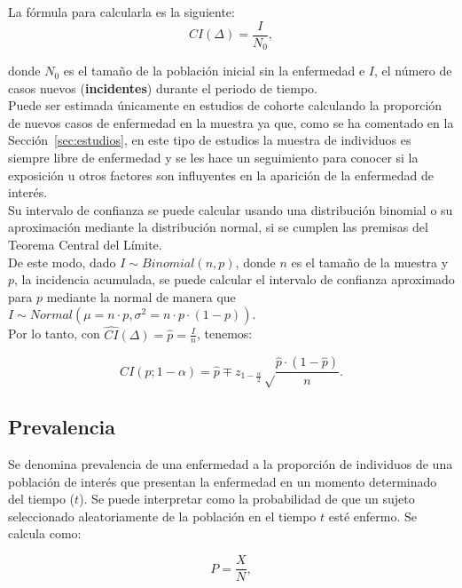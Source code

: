 La fórmula para calcularla es la siguiente:
\begin{equation*}
CI(\Delta)=\frac{I}{N_0},
\end{equation*}

donde $N_0$ es el tamaño de la población inicial sin la enfermedad e $I$, el número de casos nuevos (\textbf{incidentes}) durante el periodo de tiempo. \\

Puede ser estimada únicamente en estudios de cohorte calculando la proporción de nuevos casos de enfermedad en la muestra ya que, como se ha comentado en la Sección~\ref{sec:estudios}, en este tipo de estudios la muestra de individuos es siempre libre de enfermedad y se les hace un seguimiento para conocer si la exposición u otros factores son influyentes en la aparición de la enfermedad de interés. \\

Su intervalo de confianza se puede calcular usando una distribución binomial o su aproximación mediante la distribución normal, si se cumplen las premisas del Teorema Central del Límite. \\

De este modo, dado $I \sim Binomial(n,p)$, donde $n$ es el tamaño de la muestra y $p$, la incidencia acumulada, se puede calcular el intervalo de confianza aproximado para $p$ mediante la normal de manera que $I \sim Normal(\mu=n \cdot p, \sigma^2=n \cdot p \cdot (1-p))$. \\

Por lo tanto, con $\widehat{CI}(\Delta)=\hat{p}=\frac{I}{n}$, tenemos:

\begin{equation*}
CI(p;1-\alpha)=\hat{p} \mp z_{1-\frac{\alpha}{2}} \sqrt \frac{\hat{p} \cdot (1-\hat{p})}{n}.
\end{equation*}


\subsection{Prevalencia}
Se denomina prevalencia de una enfermedad a la proporción de individuos de una población de interés que presentan la enfermedad en un momento determinado del tiempo ($t$). Se puede interpretar como la probabilidad de que un sujeto seleccionado aleatoriamente de la población en el tiempo $t$ esté enfermo. Se calcula como:

\begin{equation*}
P=\frac{X}{N},
\end{equation*}

